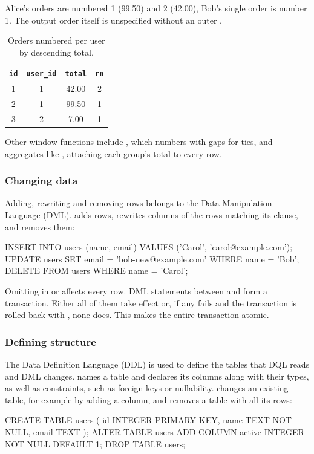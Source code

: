 Alice's orders are numbered 1 (99.50) and 2 (42.00),
Bob's single order is number 1.
The output order itself is unspecified without an outer .

\begin{table}[H]
	\centering
	\begin{tabular}{|c|c|c|c|}
		\hline
		\texttt{id} & \texttt{user\_id} & \texttt{total} & \texttt{rn} \\
		\hline
		1           & 1                 & 42.00          & 2           \\
		2           & 1                 & 99.50          & 1           \\
		3           & 2                 & 7.00           & 1           \\
		\hline
	\end{tabular}
	\caption{Orders numbered per user by descending total.}
	\label{tab:row-number}
\end{table}

Other window functions include , which numbers with gaps for ties,
and aggregates like ,
attaching each group's total to every row.

\subsubsection{Changing data}

Adding, rewriting and removing rows belongs to the Data Manipulation Language (DML).
 adds rows,  rewrites columns of the rows
matching its  clause, and  removes them:

\begin{sqlblock}
INSERT INTO users (name, email) VALUES ('Carol', 'carol@example.com');
UPDATE users SET email = 'bob-new@example.com' WHERE name = 'Bob';
DELETE FROM users WHERE name = 'Carol';
\end{sqlblock}

Omitting  in  or  affects every row.
DML statements between  and  form a transaction.
Either all of them take effect or,
if any fails and the transaction is rolled back with , none does.
This makes the entire transaction atomic.

\subsubsection{Defining structure}

The Data Definition Language (DDL) is used to define the tables
that DQL reads and DML changes.
 names a table and declares its columns along with their types,
as well as constraints, such as foreign keys or nullability.
 changes an existing table, for example by adding a column,
and  removes a table with all its rows:

\begin{sqlblock}
CREATE TABLE users (
    id INTEGER PRIMARY KEY,
    name TEXT NOT NULL,
    email TEXT
);
ALTER TABLE users ADD COLUMN active INTEGER NOT NULL DEFAULT 1;
DROP TABLE users;
\end{sqlblock}
